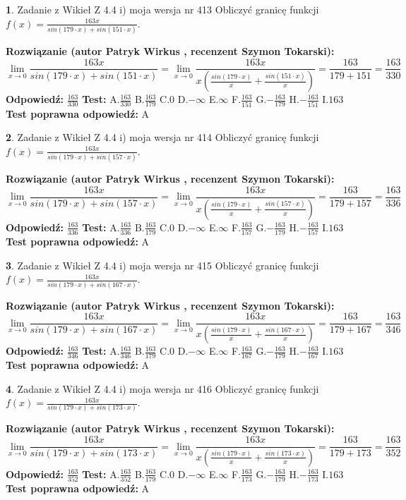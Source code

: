 \documentclass[12pt, a4paper]{article}
\theoremstyle{definition} %
\newtheorem{zad}{}
\newcommand{\zadStart}[1]{\begin{zad}#1\newline}
\newcommand{\zadStop}{\end{zad}}
\newcommand{\rozwStart}[2]{\noindent \textbf{Rozwiązanie (autor #1 , recenzent #2): }\newline}
\newcommand{\rozwStop}{\newline}
\newcommand{\odpStart}{\noindent \textbf{Odpowiedź:}\newline}
\newcommand{\odpStop}{\newline}
\newcommand{\testStart}{\noindent \textbf{Test:}\newline}
\newcommand{\testStop}{\newline}
\newcommand{\kluczStart}{\noindent \textbf{Test poprawna odpowiedź:}\newline}
\newcommand{\kluczStop}{\newline}
\begin{document}
\zadStart{Zadanie z Wikieł Z 4.4 i) moja wersja nr 413}
Obliczyć granicę funkcji $f(x)=\frac{163x}{sin(179\cdot x) +sin(151\cdot x)}$.
\zadStop
\rozwStart{Patryk Wirkus}{Szymon Tokarski}
$$\lim\limits_{x\to 0}\frac{163x}{sin(179\cdot x) +sin(151\cdot x)}=\lim\limits_{x\to 0}\frac{163x}{x(\frac{sin(179\cdot x)}{x}+\frac{sin(151\cdot x)}{x})}=\frac{163}{179+151} = \frac{163}{330}$$
\rozwStop
\odpStart
$\frac{163}{330}$
\odpStop
\testStart
A.$\frac{163}{330}$
B.$\frac{163}{179}$
C.$0$
D.$-\infty$
E.$\infty$
F.$\frac{163}{151}$
G.$-\frac{163}{179}$
H.$-\frac{163}{151}$
I.$163$
\testStop
\kluczStart
A
\kluczStop



\zadStart{Zadanie z Wikieł Z 4.4 i) moja wersja nr 414}
Obliczyć granicę funkcji $f(x)=\frac{163x}{sin(179\cdot x) +sin(157\cdot x)}$.
\zadStop
\rozwStart{Patryk Wirkus}{Szymon Tokarski}
$$\lim\limits_{x\to 0}\frac{163x}{sin(179\cdot x) +sin(157\cdot x)}=\lim\limits_{x\to 0}\frac{163x}{x(\frac{sin(179\cdot x)}{x}+\frac{sin(157\cdot x)}{x})}=\frac{163}{179+157} = \frac{163}{336}$$
\rozwStop
\odpStart
$\frac{163}{336}$
\odpStop
\testStart
A.$\frac{163}{336}$
B.$\frac{163}{179}$
C.$0$
D.$-\infty$
E.$\infty$
F.$\frac{163}{157}$
G.$-\frac{163}{179}$
H.$-\frac{163}{157}$
I.$163$
\testStop
\kluczStart
A
\kluczStop



\zadStart{Zadanie z Wikieł Z 4.4 i) moja wersja nr 415}
Obliczyć granicę funkcji $f(x)=\frac{163x}{sin(179\cdot x) +sin(167\cdot x)}$.
\zadStop
\rozwStart{Patryk Wirkus}{Szymon Tokarski}
$$\lim\limits_{x\to 0}\frac{163x}{sin(179\cdot x) +sin(167\cdot x)}=\lim\limits_{x\to 0}\frac{163x}{x(\frac{sin(179\cdot x)}{x}+\frac{sin(167\cdot x)}{x})}=\frac{163}{179+167} = \frac{163}{346}$$
\rozwStop
\odpStart
$\frac{163}{346}$
\odpStop
\testStart
A.$\frac{163}{346}$
B.$\frac{163}{179}$
C.$0$
D.$-\infty$
E.$\infty$
F.$\frac{163}{167}$
G.$-\frac{163}{179}$
H.$-\frac{163}{167}$
I.$163$
\testStop
\kluczStart
A
\kluczStop



\zadStart{Zadanie z Wikieł Z 4.4 i) moja wersja nr 416}
Obliczyć granicę funkcji $f(x)=\frac{163x}{sin(179\cdot x) +sin(173\cdot x)}$.
\zadStop
\rozwStart{Patryk Wirkus}{Szymon Tokarski}
$$\lim\limits_{x\to 0}\frac{163x}{sin(179\cdot x) +sin(173\cdot x)}=\lim\limits_{x\to 0}\frac{163x}{x(\frac{sin(179\cdot x)}{x}+\frac{sin(173\cdot x)}{x})}=\frac{163}{179+173} = \frac{163}{352}$$
\rozwStop
\odpStart
$\frac{163}{352}$
\odpStop
\testStart
A.$\frac{163}{352}$
B.$\frac{163}{179}$
C.$0$
D.$-\infty$
E.$\infty$
F.$\frac{163}{173}$
G.$-\frac{163}{179}$
H.$-\frac{163}{173}$
I.$163$
\testStop
\kluczStart
A
\kluczStop
\end{document}

